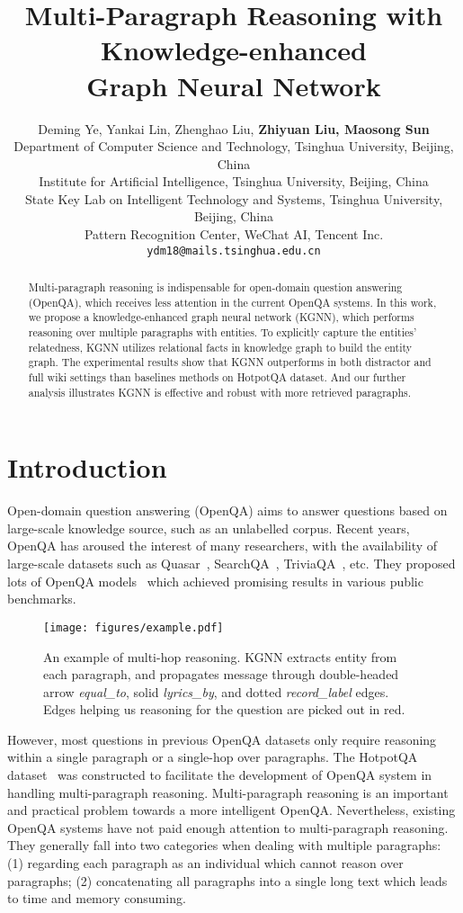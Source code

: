 \documentclass[11pt,a4paper]{article}
\title{Multi-Paragraph Reasoning with Knowledge-enhanced \\
Graph Neural Network}
\author{Deming Ye, Yankai Lin, Zhenghao Liu,  \textbf{Zhiyuan Liu, Maosong Sun}\\
Department of Computer Science and Technology, Tsinghua University, Beijing, China\\
Institute for Artificial Intelligence, Tsinghua University, Beijing, China\\
State Key Lab on Intelligent Technology and Systems, Tsinghua University, Beijing, China \\
Pattern Recognition Center, WeChat AI, Tencent Inc.\\
\texttt{ydm18@mails.tsinghua.edu.cn}
}
\date{}
\newcommand\OurModel{KGNN\xspace}
\begin{document}
\maketitle
\begin{abstract}
Multi-paragraph reasoning is indispensable for open-domain question answering (OpenQA), which receives less attention in the current OpenQA systems. In this work, we propose a knowledge-enhanced graph neural network (KGNN), which performs reasoning over multiple paragraphs with entities. To explicitly capture the entities' relatedness, KGNN utilizes relational facts in knowledge graph to build the entity graph. The experimental results show that KGNN outperforms in both distractor and full wiki settings than baselines methods on HotpotQA dataset. And our further analysis illustrates KGNN is effective and robust with more retrieved paragraphs. 


\end{abstract}



\section{Introduction}
\label{sec:introduction}


Open-domain question answering (OpenQA) aims to answer questions based on large-scale knowledge source, such as an unlabelled corpus. Recent years, OpenQA has aroused the interest of many researchers, with the availability of large-scale datasets such as Quasar~\citep{dhingra2017quasar}, SearchQA~\citep{dunn2017searchqa}, TriviaQA~\citep{joshi-EtAl:2017:Long}, etc. They proposed lots of OpenQA models~\citep{chen-EtAl:2017:Long4,clark2017simple,wang2018r3,wang2017evidence,choi2017coarse,lin2018denoising} which achieved promising results in various public benchmarks.

\begin{figure}[t]
    \centering
    \texttt{[image: figures/example.pdf]}
    \caption{An example of multi-hop reasoning. \OurModel extracts entity from each paragraph, and propagates message through double-headed arrow \emph{equal\_to}, solid \emph{lyrics\_by}, and dotted \emph{record\_label} edges.  Edges helping us reasoning for the question are picked out in red. }
    \label{fig:example}
    \vspace{-1.5em}
\end{figure}
However, most questions in previous OpenQA datasets only require reasoning within a single paragraph or a single-hop over paragraphs. The HotpotQA dataset~\citep{yang2018hotpotqa} was constructed to facilitate the development of OpenQA system in handling multi-paragraph reasoning. Multi-paragraph reasoning is an important and practical problem towards a more intelligent OpenQA. Nevertheless, existing OpenQA systems have not paid enough attention to multi-paragraph reasoning. They generally fall into two categories when dealing with multiple paragraphs: (1) regarding each paragraph as an individual which cannot reason over paragraphs; (2) concatenating all paragraphs into a single long text which leads to time and memory consuming. 
\end{document}
